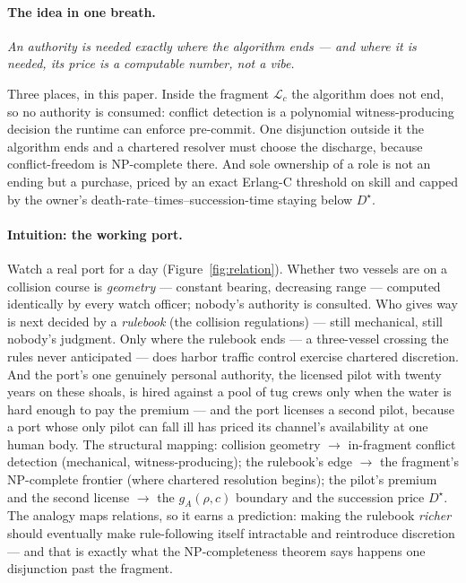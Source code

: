 \documentclass[11pt,a4paper]{article}
\newcommand{\onebreath}[1]{\begin{center}\emph{#1}\end{center}}
\begin{document}
\paragraph{The idea in one breath.}
\onebreath{An authority is needed exactly where the algorithm ends --- and where it is needed, its price is a computable number,
not a vibe.}
\noindent Three places, in this paper. Inside the fragment $\mathcal{L}_c$ the algorithm does not end, so no authority is consumed:
conflict detection is a polynomial witness-producing decision the runtime can enforce pre-commit. One disjunction outside it the
algorithm ends and a chartered resolver must choose the discharge, because conflict-freedom is NP-complete there. And sole
ownership of a role is not an ending but a purchase, priced by an exact Erlang-C threshold on skill and capped by the owner's
death-rate--times--succession-time staying below $D^\star$.

\paragraph{Intuition: the working port.} Watch a real port for a day (Figure~\ref{fig:relation}). Whether two vessels are on a
collision course is \emph{geometry} --- constant bearing, decreasing range --- computed identically by every watch officer;
nobody's authority is consulted. Who gives way is next decided by a \emph{rulebook} (the collision regulations) --- still
mechanical, still nobody's judgment. Only where the rulebook ends --- a three-vessel crossing the rules never anticipated --- does
harbor traffic control exercise chartered discretion. And the port's one genuinely personal authority, the licensed pilot with
twenty years on these shoals, is hired against a pool of tug crews only when the water is hard enough to pay the premium ---
and the port licenses a second pilot, because a port whose only pilot can fall ill has priced its channel's availability at one
human body. The structural mapping: collision geometry $\to$ in-fragment conflict detection (mechanical, witness-producing);
the rulebook's edge $\to$ the fragment's NP-complete frontier (where chartered resolution begins); the pilot's premium and the
second license $\to$ the $g_A(\rho,c)$ boundary and the succession price $D^\star$. The analogy maps relations, so it earns a
prediction: making the rulebook \emph{richer} should eventually make rule-following itself intractable and reintroduce discretion
--- and that is exactly what the NP-completeness theorem says happens one disjunction past the fragment.
\end{document}
